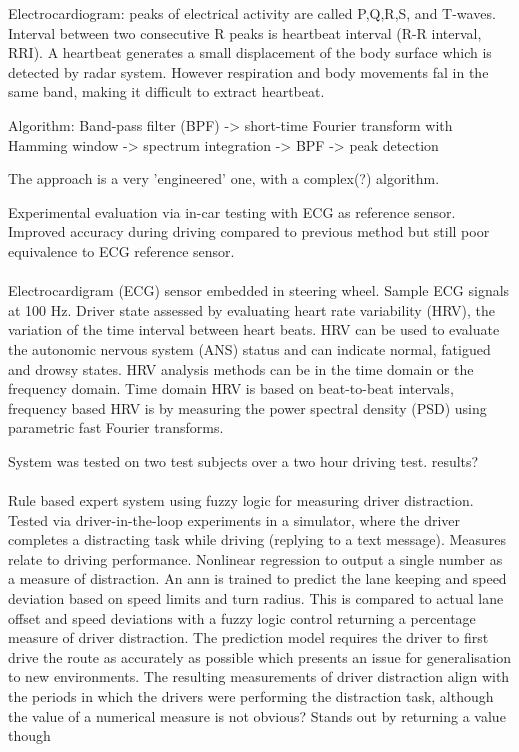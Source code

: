 \documentclass[11pt, parskip=half*,twoside=false]{scrbook}
\begin{document}
Electrocardiogram: peaks of electrical activity are called P,Q,R,S, and T-waves. Interval between two consecutive R peaks is heartbeat interval (R-R interval, RRI). A heartbeat generates a small displacement of the body surface which is detected by radar system. However  respiration and body movements fal in the same band, making it difficult to extract heartbeat.

Algorithm: Band-pass filter (BPF) -> short-time Fourier transform with Hamming window -> spectrum integration -> BPF -> peak detection

The approach is a very 'engineered' one, with a complex(?) algorithm. 

Experimental evaluation via in-car testing with ECG as reference sensor. Improved accuracy during driving compared to previous method but still poor equivalence to ECG reference sensor.

\paragraph{\citet{jungDriverFatigueDrowsiness2014}} Electrocardigram (ECG) sensor embedded in steering wheel. Sample ECG signals at 100 Hz. Driver state assessed by evaluating heart rate variability (HRV), the variation of the time interval between heart beats. HRV can be used to evaluate the autonomic nervous system (ANS) status and can indicate normal, fatigued and drowsy states. HRV analysis methods can be in the time domain or the frequency domain. Time domain HRV is based on beat-to-beat intervals, frequency based HRV is by measuring the power spectral density (PSD) using parametric fast Fourier transforms.
	
System was tested on two test subjects over a two hour driving test. results?

\paragraph{\citet{aksjonovDetectionEvaluationDriver2019}} Rule based expert system using fuzzy logic for measuring driver distraction. Tested via driver-in-the-loop experiments in a simulator, where the driver completes a distracting task while driving (replying to a text message). Measures relate to driving performance. Nonlinear regression to output a single number as a measure of distraction. An \gls{ann} is trained to predict the lane keeping and speed deviation based on speed limits and turn radius. This is compared to actual lane offset and speed deviations with a fuzzy logic control returning a percentage measure of driver distraction. The prediction model requires the driver to first drive the route as accurately as possible which presents an issue for generalisation to new environments. The resulting measurements of driver distraction align with the periods in which the drivers were performing the distraction task, although the value of a numerical measure is not obvious?  Stands out by returning a value though
\end{document}
